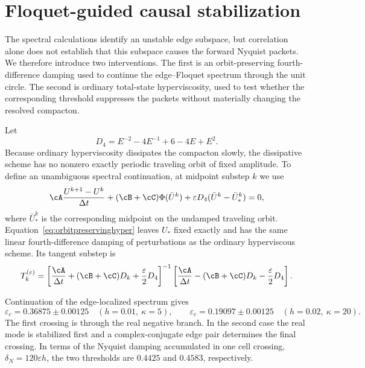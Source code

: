 \section{Floquet-guided causal stabilization}
\label{sec:control}

The spectral calculations identify an unstable edge subspace, but correlation
alone does not establish that this subspace causes the forward Nyquist packets.
We therefore introduce two interventions. The first is an orbit-preserving
fourth-difference damping used to continue the edge--Floquet spectrum through
the unit circle. The second is ordinary total-state hyperviscosity, used to test
whether the corresponding threshold suppresses the packets without materially
changing the resolved compacton.

Let
\begin{equation}
 D_4=E^{-2}-4E^{-1}+6-4E+E^2.
\end{equation}
Because ordinary hyperviscosity dissipates the compacton slowly, the dissipative
scheme has no nonzero exactly periodic traveling orbit of fixed amplitude. To
define an unambiguous spectral continuation, at midpoint substep $k$ we use
\begin{equation}
 \cA\frac{U^{k+1}-U^k}{\Delta t}
 +(\cB+\cC)\Phi(\bar U^k)
 +\varepsilon D_4(\bar U^k-\bar U_*^k)=0,
 \label{eq:orbitpreservinghyper}
\end{equation}
where $\bar U_*^k$ is the corresponding midpoint on the undamped traveling
orbit. Equation~\eqref{eq:orbitpreservinghyper} leaves $U_*$ fixed exactly and
has the same linear fourth-difference damping of perturbations as the ordinary
hyperviscous scheme. Its tangent substep is
\begin{equation}
 T_k^{(\varepsilon)}=
 \left[\frac{\cA}{\Delta t}+(\cB+\cC)D_k+\frac{\varepsilon}{2}D_4\right]^{-1}
 \left[\frac{\cA}{\Delta t}-(\cB+\cC)D_k-\frac{\varepsilon}{2}D_4\right].
 \label{eq:controlledtangent}
\end{equation}

Continuation of the edge-localized spectrum gives
\begin{equation}
 \varepsilon_c=0.36875\pm0.00125
 \quad(h=0.01,\ \kappa=5),
 \qquad
 \varepsilon_c=0.19097\pm0.00125
 \quad(h=0.02,\ \kappa=20).
 \label{eq:epscritical}
\end{equation}
The first crossing is through the real negative branch. In the second case the
real mode is stabilized first and a complex-conjugate edge pair determines the
final crossing. In terms of the Nyquist damping accumulated in one cell
crossing, $\delta_N=120\varepsilon h$, the two thresholds are $0.4425$ and
$0.4583$, respectively.

